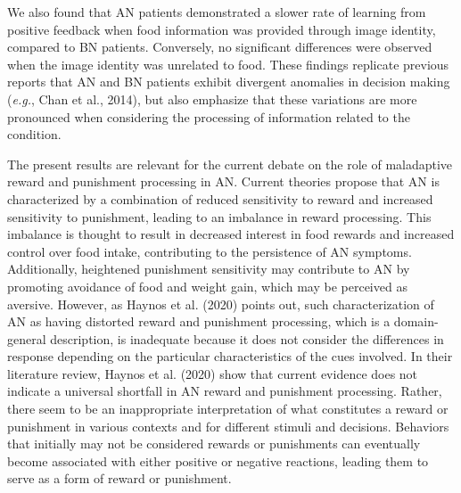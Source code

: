 \documentclass[
  man,floatsintext]{apa6}
\begin{document}
We also found that AN patients demonstrated a slower rate of learning from positive feedback when food information was provided through image identity, compared to BN patients. Conversely, no significant differences were observed when the image identity was unrelated to food. These findings replicate previous reports that AN and BN patients exhibit divergent anomalies in decision making (\emph{e.g.}, Chan et al., 2014), but also emphasize that these variations are more pronounced when considering the processing of information related to the condition.

The present results are relevant for the current debate on the role of maladaptive reward and punishment processing in AN. Current theories propose that AN is characterized by a combination of reduced sensitivity to reward and increased sensitivity to punishment, leading to an imbalance in reward processing. This imbalance is thought to result in decreased interest in food rewards and increased control over food intake, contributing to the persistence of AN symptoms. Additionally, heightened punishment sensitivity may contribute to AN by promoting avoidance of food and weight gain, which may be perceived as aversive. However, as Haynos et al. (2020) points out, such characterization of AN as having distorted reward and punishment processing, which is a domain-general description, is inadequate because it does not consider the differences in response depending on the particular characteristics of the cues involved. In their literature review, Haynos et al. (2020) show that current evidence does not indicate a universal shortfall in AN reward and punishment processing. Rather, there seem to be an inappropriate interpretation of what constitutes a reward or punishment in various contexts and for different stimuli and decisions. Behaviors that initially may not be considered rewards or punishments can eventually become associated with either positive or negative reactions, leading them to serve as a form of reward or punishment.
\end{document}
